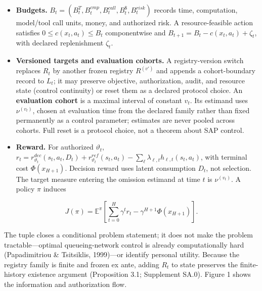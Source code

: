\documentclass[
  11pt]{article}
\begin{document}
\begin{itemize}
\item
  \textbf{Budgets.}
  \(B_t=(B_t^T,B_t^{cmp},B_t^{call},B_t^{\$},B_t^{risk})\) records time,
  computation, model/tool call units, money, and authorized risk. A
  resource-feasible action satisfies \(0\le c(x_t,a_t)\le B_t\)
  componentwise and \(B_{t+1}=B_t-c(x_t,a_t)+\zeta_t\), with declared
  replenishment \(\zeta_t\).
\item
  \textbf{Versioned targets and evaluation cohorts.} A registry-version
  switch replaces \(R_t\) by another frozen registry \(R^{(v')}\) and
  appends a cohort-boundary record to \(L_t\); it may preserve
  objective, authorization, audit, and resource state (control
  continuity) or reset them as a declared protocol choice. An
  \textbf{evaluation cohort} is a maximal interval of constant \(v_t\).
  Its estimand uses \(\nu^{(v_t)}\), chosen at evaluation time from the
  declared family rather than fixed permanently as a control parameter;
  estimates are never pooled across cohorts. Full reset is a protocol
  choice, not a theorem about SAP control.
\item
  \textbf{Reward.} For authorized \(\vartheta_t\),
  \(r_t=r^{dec}_{\vartheta_t}(s_t,a_t,D_t)+r^{ref}_{\vartheta_t}(s_t,a_t)-\sum_\ell\lambda_{\ell,t}h_{\ell,t}(s_t,a_t)\),
  with terminal cost \(\Phi(x_{H+1})\). Decision reward uses latent
  consumption \(D_t\), not selection. The target measure entering the
  omission estimand at time \(t\) is \(\nu^{(v_t)}\). A policy \(\pi\)
  induces
\end{itemize}

\[J(\pi)=\mathbb E^\pi\!\left[\sum_{t=0}^{H}\gamma^t r_t-\gamma^{H+1}\Phi(x_{H+1})\right].\tag{2}\]

The tuple closes a conditional problem statement; it does not make the
problem tractable---optimal queueing-network control is already
computationally hard (Papadimitriou \& Tsitsiklis, 1999)---or identify
personal utility. Because the registry family is finite and frozen ex
ante, adding \(R_t\) to state preserves the finite-history existence
argument (Proposition 3.1; Supplement SA.0). Figure 1 shows the
information and authorization flow.
\end{document}
